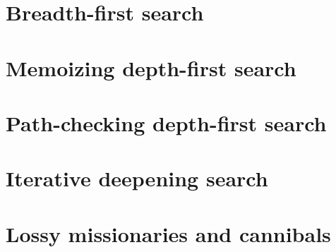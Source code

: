 \documentclass[a4paper]{report}
\begin{document}
\section{Breadth-first search}


\section{Memoizing depth-first search}

\section{Path-checking depth-first search}

\section{Iterative deepening search}



\section{Lossy missionaries and cannibals}
\end{document}
